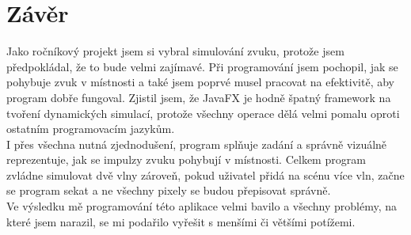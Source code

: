 \section{Závěr}
Jako ročníkový projekt jsem si vybral simulování zvuku, protože jsem předpokládal, že to bude velmi zajímavé. Při programování jsem pochopil, jak se pohybuje zvuk v místnosti a také jsem poprvé musel pracovat na efektivitě, aby program dobře fungoval. Zjistil jsem, že JavaFX  je hodně špatný framework  na tvoření dynamických simulací, protože všechny operace dělá velmi pomalu oproti ostatním programovacím jazykům. \\
I přes všechna nutná zjednodušení, program splňuje zadání a správně vizuálně reprezentuje, jak se impulzy zvuku pohybují v místnosti. Celkem program zvládne simulovat dvě vlny zároveň, pokud uživatel přidá na scénu více vln, začne se program sekat a ne všechny pixely se budou přepisovat správně.  \\
Ve výsledku mě programování této aplikace velmi bavilo a všechny problémy, na které jsem narazil, se mi podařilo vyřešit s menšími či většími potížemi. 